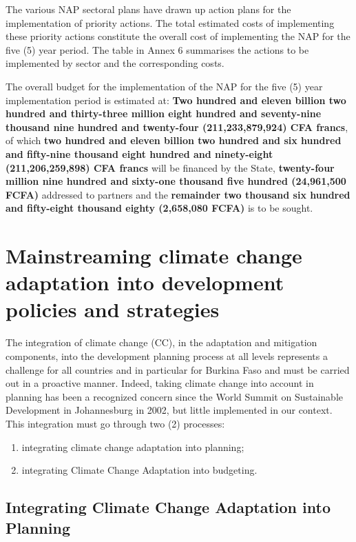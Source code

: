 \documentclass[
]{book}
\begin{document}
The various NAP sectoral plans have drawn up action plans for the implementation of priority actions. The total estimated costs of implementing these priority actions constitute the overall cost of implementing the NAP for the five (5) year period. The table in Annex 6 summarises the actions to be implemented by sector and the corresponding costs.

The overall budget for the implementation of the NAP for the five (5) year implementation period is estimated at: \textbf{Two hundred and eleven billion two hundred and thirty-three million eight hundred and seventy-nine thousand nine hundred and twenty-four (211,233,879,924) CFA francs}, of which \textbf{two hundred and eleven billion two hundred and six hundred and fifty-nine thousand eight hundred and ninety-eight (211,206,259,898) CFA francs} will be financed by the State, \textbf{twenty-four million nine hundred and sixty-one thousand five hundred (24,961,500 FCFA)} addressed to partners and the \textbf{remainder two thousand six hundred and fifty-eight thousand eighty (2,658,080 FCFA)} is to be sought.

\section{Mainstreaming climate change adaptation into development policies and strategies}\label{mainstreaming-climate-change-adaptation-into-development-policies-and-strategies}

The integration of climate change (CC), in the adaptation and mitigation components, into the development planning process at all levels represents a challenge for all countries and in particular for Burkina Faso and must be carried out in a proactive manner. Indeed, taking climate change into account in planning has been a recognized concern since the World Summit on Sustainable Development in Johannesburg in 2002, but little implemented in our context. This integration must go through two (2) processes:

\begin{enumerate}
\def\labelenumi{\arabic{enumi}.}
\item
  integrating climate change adaptation into planning;
\item
  integrating Climate Change Adaptation into budgeting.
\end{enumerate}

\subsection{Integrating Climate Change Adaptation into Planning}\label{integrating-climate-change-adaptation-into-planning}
\end{document}
